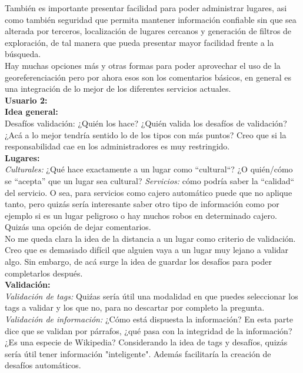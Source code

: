 \documentclass[10pt,letterpaper]{article}
\begin{document}
También es importante presentar facilidad para poder administrar lugares, asi como también seguridad que permita mantener información confiable sin que sea alterada por terceros, localización de lugares cercanos y generación de filtros de exploración, de tal manera que pueda presentar mayor facilidad frente a la búsqueda.\\

Hay muchas opciones más y otras formas para poder aprovechar el uso de la georeferenciación pero por ahora esos son los comentarios básicos, en general es una integración de lo mejor de los diferentes servicios actuales.\\

\textbf{Usuario 2:}\\

\textbf{Idea general:}\\

Desafíos validación: ¿Quién los hace? ¿Quién valida los desafíos de validación? ¿Acá a lo mejor tendría sentido lo de los tipos con más puntos? Creo que si la responsabilidad cae en los administradores es muy restringido.\\

\textbf{Lugares:}\\

\textsl{Culturales:} ¿Qué hace exactamente a un lugar como ``cultural``? ¿O quién/cómo se ``acepta'' que un lugar sea cultural?
\textsl{Servicios:} cómo podría saber la ``calidad`` del servicio. O sea, para servicios como cajero automático puede que no aplique tanto, pero quizás sería interesante saber otro tipo de información como por ejemplo si es un lugar peligroso o hay muchos robos en determinado cajero. Quizás una opción de dejar comentarios.\\

No me queda clara la idea de la distancia a un lugar como criterio de validación. Creo que es demasiado difícil que alguien vaya a un lugar muy lejano a validar algo. Sin embargo, de acá surge la idea de guardar los desafíos para poder completarlos después.\\

\textbf{Validación:}\\

\textsl{Validación de tags:} Quiźas sería útil una modalidad en que puedes seleccionar los tags a validar y los que no, para no descartar por completo la pregunta.\\

\textsl{Validación de información:} ¿Cómo está dispuesta la información? En esta parte dice que se validan por párrafos, ¿qué pasa con la integridad de la información? ¿Es una especie de Wikipedia? Considerando la idea de tags y desafíos, quizás sería útil tener información "inteligente". Además facilitaría la creación de desafíos automáticos.\\
\end{document}
